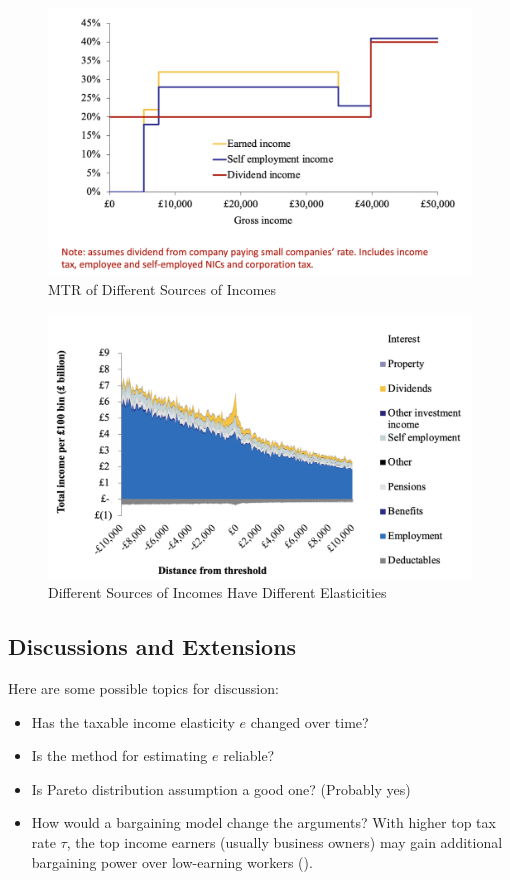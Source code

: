                 \begin{figure}[H]
                    \centering
                    \includegraphics[width=4.5in]{images/ch13/13_bunching_4.png}
                    \caption{MTR of Different Sources of Incomes}
                \end{figure}

                \begin{figure}[H]
                    \centering
                    \includegraphics[width=4.5in]{images/ch13/13_bunching_5.png}
                    \caption{Different Sources of Incomes Have Different Elasticities}
                \end{figure}


    \subsection{Discussions and Extensions}

        Here are some possible topics for discussion:
        \begin{itemize}
            \item Has the taxable income elasticity $e$ changed over time?
            \item Is the method for estimating $e$ reliable?
            \item Is Pareto distribution assumption a good one? (Probably yes)
            \item How would a bargaining model change the arguments? With higher top tax rate $\tau$, the top income earners (usually business owners) may gain additional bargaining power over low-earning workers (\cite{piketty_optimal_2014}).
        \end{itemize}



